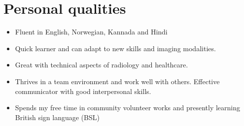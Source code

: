 \documentclass[a4paper,10pt]{article}
\begin{document}
\section{Personal qualities}
\begin{itemize}
  \item Fluent in English, Norwegian, Kannada and Hindi
  \vspace{-0.2cm}\item Quick learner and can adapt to new skills and imaging modalities.
  \vspace{-0.2cm}\item Great with technical aspects of radiology and healthcare. 
  \vspace{-0.2cm}\item Thrives in a team environment and work well with others. Effective communicator with good interpersonal skills.
  \vspace{-0.2cm}\item Spends my free time in community volunteer works and presently learning British sign language (BSL)
\end{itemize}


\end{document}
